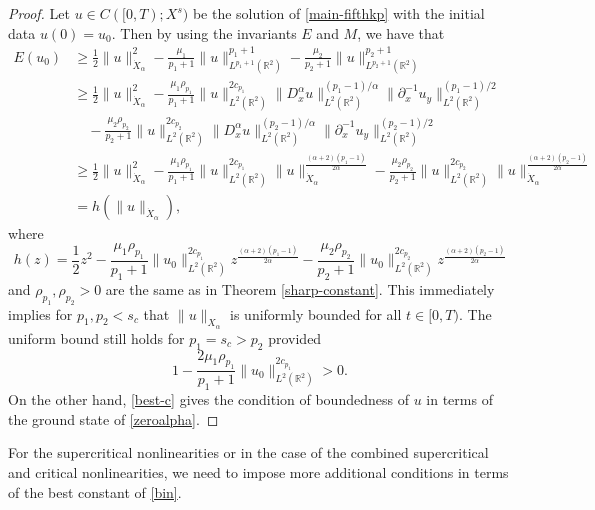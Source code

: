 \documentclass[10pt]{article}
\numberwithin{equation}{section}
\newcommand{\lt}{{L^2(\mathbb{R}^2)}}
\newcommand{\x}{{X_\alpha}}
\newcommand{\xx}{{\dot{X}_\alpha}}
\newcommand{\nd}{{\partial_x^{-1}}}
\newcommand{\dx}{D_x^{\alpha}}
\newcommand{\mo}{\mu_1}  \newcommand{\po}{{p_1}}
\newcommand{\moo}{\mu_2}  \newcommand{\poo}{{p_2}}
\newcommand{\al}{\alpha}
\newcommand{\rt}{{\mathbb{R}^2}}
\begin{document}
	
	\begin{proof}
		Let $u\in  C([0, T ); X^s)$ be the solution of \eqref{main-fifthkp} with the
		initial data $u(0)=u_0$. Then by using the invariants $E$ and $M$, we have  that
		\begin{equation}\label{energy-estimate-1}
			\begin{split}
				E(u_0)&\geq\frac{1}{2}\|u\|_{\xx}^2-\frac{\mo}{\po+1}\|u\|_{L^{\po+1}(\rt)}^{\po+1}-\frac{\moo}{\poo+1}\|u\|_{L^{\poo+1}(\rt)}^{\poo+1}\\
				&\geq \frac{1}{2}\|u\|_{\xx}^2-\frac{\mo \rho_{p_1}}{\po+1}\|u\|_\lt^{2c_{p_1}}\|\dx u\|_\lt^{(\po-1)/\al}\|\nd u_y\|_\lt^{(\po-1)/2}\\
				&\quad-\frac{\moo \rho_{p_2}}{\poo+1}\|u\|_\lt^{2c_{p_2}}\|\dx u\|_\lt^{(\poo-1)/\al}\|\nd u_y\|_\lt^{(\poo-1)/2}\\
				& \geq \frac{1}{2}\|u\|_{\xx}^2-
				\frac{\mo \rho_{p_1}}{\po+1}\|u\|_\lt^{2c_{p_1}}\|u\|_{\xx}^{\frac{(\al+2)(\po-1)}{2\al}}-\frac{\moo \rho_{p_2}}{\poo+1}\|u\|_\lt^{2c_{p_2}}\|u\|_{\xx}^{\frac{(\al+2)(\poo-1)}{2\al}}\\
				&=h(\|u\|_{\xx}),
			\end{split}
		\end{equation}
		where
		\[
		h(z)=\frac{1}{2}z^2-
		\frac{ \mo \rho_{p_1}}{\po+1}\|u_0\|_\lt^{2c_{p_1}}z^{\frac{(\al+2)(\po-1)}{2\al}}-\frac{ \moo \rho_{p_2}}{\poo+1}\|u_0\|_\lt^{2c_{p_2}}z^{\frac{(\al+2)(\poo-1)}{2\al}}
		\]
		and $\rho_{p_1},\rho_{p_2}>0$ are the same as in Theorem \ref{sharp-constant}.
		This   immediately implies for  $p_1,p_2<s_c$ that $\|u\|_\x$ is uniformly bounded for all $t\in[0, T )$. 
		The uniform bound still holds for $p_1=s_c>p_2$ provided	
		\[
		1-\frac{2\mu_1\rho_{p_1}}{\po+1}\|u_0\|_\lt^{2c_{p_1}}>0.
		\]
		On the other hand, \eqref{best-c} gives the condition of boundedness of $u$ in terms of the ground state of \eqref{zeroalpha}.
	\end{proof} 
	
	
	For the supercritical nonlinearities or in the case of the combined supercritical and critical nonlinearities, we need to impose more additional conditions in terms of the best constant of \eqref{bin}.
	
\end{document}
